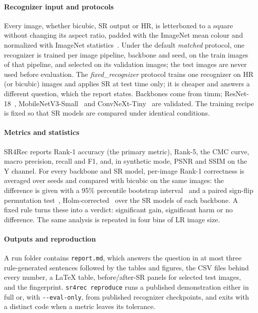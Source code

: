 \documentclass[preprint,12pt]{elsarticle}
\begin{document}
\paragraph{Recognizer input and protocols} Every image, whether bicubic, SR output or HR, is
letterboxed to a square without changing its aspect ratio, padded with the ImageNet mean colour and
normalized with ImageNet statistics~\cite{deng2009imagenet}. Under the default \emph{matched}
protocol, one recognizer is trained per image pipeline, backbone and seed, on the train images of that
pipeline, and selected on its validation images; the test images are never used before evaluation.
The \emph{fixed\_recognizer} protocol trains one recognizer on HR (or bicubic) images and applies
SR at test time only; it is cheaper and answers a different question, which the report states.
Backbones come from timm; ResNet-18~\cite{he2016resnet}, MobileNetV3-Small~\cite{howard2019mobilenetv3}
and ConvNeXt-Tiny~\cite{liu2022convnext} are validated. The training recipe is fixed so that SR
models are compared under identical conditions.

\paragraph{Metrics and statistics} SR4Rec reports Rank-1 accuracy (the primary metric), Rank-5, the
CMC curve, macro precision, recall and F1, and, in synthetic mode, PSNR and SSIM on the Y channel.
For every backbone and SR model, per-image Rank-1 correctness is averaged over seeds and compared
with bicubic on the same images: the difference is given with a 95\% percentile bootstrap
interval~\cite{efron1993bootstrap} and a paired sign-flip permutation test~\cite{good2005permutation},
Holm-corrected~\cite{holm1979} over the SR models of each backbone. A fixed rule turns these into a
verdict: significant gain, significant harm or no difference. The same analysis is repeated in four
bins of LR image size.

\paragraph{Outputs and reproduction} A run folder contains \texttt{report.md}, which answers the
question in at most three rule-generated sentences followed by the tables and figures, the CSV files
behind every number, a \LaTeX{} table, before/after-SR panels for selected test images, and the
fingerprint. \texttt{sr4rec reproduce} runs a published demonstration either in full or, with
\texttt{-{}-eval-only}, from published recognizer checkpoints, and exits with a distinct code when a
metric leaves its tolerance.
\end{document}
